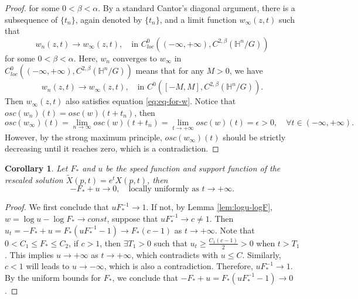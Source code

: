 \documentclass[reqno]{amsart}
\newtheorem{corollary}[theorem]{Corollary}
\theoremstyle{remark}
\renewcommand{\H}{{\mathbb{H}}}
\theoremstyle{definition}
\numberwithin{equation}{section}
\begin{document}
\begin{proof}
    for some \(0 < \beta < \alpha\). By a standard Cantor's diagonal argument, there is a subsequence of \(\{t_n\}\), again denoted by \(\{t_n\}\), and a limit function \(w_{\infty}(z,t)\) such that 
    \[ w_n(z,t) \to w_{\infty}(z,t), \quad \text{in }C_{loc}^{0}\left((-\infty,+\infty),C^{2,\beta}(\H^n / G)\right) \]
    for some \(0 < \beta < \alpha\). Here, \(w_n\) converges to \(w_{\infty}\) in \(C_{loc}^{0}\left((-\infty,+\infty),C^{2,\beta}(\H^n / G)\right)\) means that for any \(M > 0\), we have 
    \[ w_n(z,t) \to w_{\infty}(z,t), \quad \text{in }C^{0}\left([-M,M],C^{2,\beta}(\H^n / G)\right). \] 
    Then \(w_\infty(z,t)\) also satisfies equation \eqref{eq:eq-for-w}. Notice that \( osc(w_n)(t) = osc(w)(t+t_n)\), then 
    \[ osc(w_\infty)(t) = \lim_{n\to \infty}osc(w)(t+t_n) = \lim_{t\to +\infty}osc(w)(t) = \epsilon > 0, \quad \forall t\in (-\infty,+\infty). \]
    However, by the strong maximum principle, \(osc(w_\infty)(t)\) should be strictly decreasing until it reaches zero, which is a contradiction. 
\end{proof}


\begin{corollary}
    Let \(F_*\) and \(u\) be the speed function and support function of the rescaled solution \(\tilde{X}(p,t) = e^t X(p,t)\), then 
    \[ -F_* + u \to 0,\quad \text{locally uniformly as }t\to +\infty. \]
\end{corollary}
\begin{proof}
    We first conclude that \(u F_*^{-1} \to 1\). If not, by Lemma \ref{lem:logu-logF}, \(w = \log u - \log F_* \to const\), suppose that \(u F_*^{-1} \to c\neq 1\). Then \(u_t = -F_* + u = F_*(uF_*^{-1} - 1) \to F_*(c-1) \) as \(t \to +\infty\). Note that \(0 < C_1 \leq F_* \leq C_2\), if \(c > 1\), then \(\exists T_1 > 0\) such that \(u_t \geq \frac{C_1 (c-1)}{2} > 0 \) when \(t > T_1\). This implies \(u \to +\infty\) as \(t\to +\infty\), which contradicts with \(u \leq C\). Similarly, \(c < 1\) will leads to \(u \to -\infty\), which is also a contradiction. Therefore, \(u F_*^{-1} \to 1\). By the uniform bounds for \(F_*\), we conclude that \(-F_* + u = F_*(uF_*^{-1} - 1) \to 0\).
\end{proof}
\end{document}
